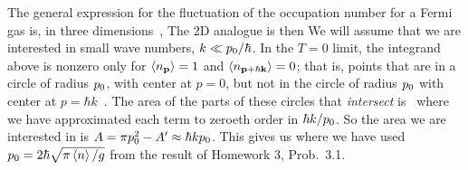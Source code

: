 {	The general expression for the fluctuation of the occupation number for a Fermi gas is, in three dimensions~\cite[p.~356]{Landau2},
	The 2D analogue is then
	We will assume that we are interested in small wave numbers, $k \ll p_0 / \hbar$.  In the $T =  0$ limit, the integrand above is nonzero only for $\ev{n_{\vp}} = 1$ and $\ev{n_{\vp + \hbar \vk}} = 0$; that is, points that are in a circle of radius $p_0$, with center at $p = 0$, but not in the circle of radius $p_0$ with center at $p = \hbar k$~\cite[p.~357]{Landau}.  The area of the parts of these circles that \emph{intersect} is~\cite{Intersection}
	where we have approximated each term to zeroeth order in $\hbar k / p_0$.  So the area we are interested in is $A = \pi p_0^2 - A' \approx \hbar k p_0$.  This gives us
	where we have used $\po = 2\hbar \sqrt{\pi \evn / g}$ from the result of Homework 3, Prob.~{3.1}.
}


%
%


